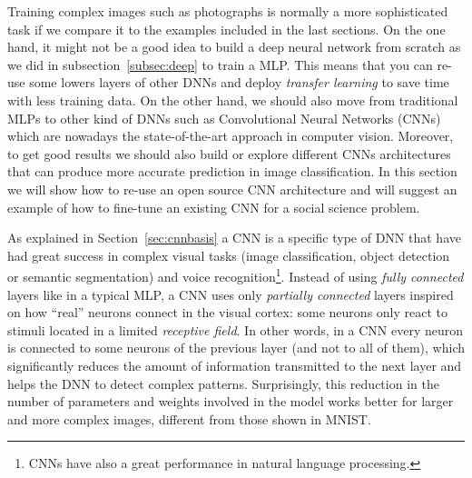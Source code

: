 Training complex images such as photographs is normally a more sophisticated task if we compare it to the examples included in the last sections. On the one hand, it might not be a good idea to build a deep neural network from scratch as we did in subsection~\ref{subsec:deep} to train a MLP. This means that you can re-use some lowers layers of other DNNs and deploy \textit{transfer learning} to save time with less training data. On the other hand, we should also move from traditional MLPs to other kind of DNNs such as Convolutional Neural Networks (CNNs) which are  nowadays the state-of-the-art approach in computer vision. Moreover, to get good results we should also build or explore different CNNs architectures that can produce more accurate prediction in image classification.  In this section we will show how to re-use an open source CNN architecture and will suggest an example of how to fine-tune an existing CNN for a social science problem.

As explained in Section~\ref{sec:cnnbasis} a CNN is a specific type of DNN that have had great success in complex visual tasks (image classification, object detection or semantic segmentation) and voice recognition\footnote{CNNs have also a great performance in natural language processing.}. Instead of using \textit{fully connected} layers like in a typical MLP, a CNN uses only \textit{partially connected} layers inspired on how ``real'' neurons connect in the visual cortex: some neurons only react to stimuli located in a limited \textit{receptive field}. In other words, in a CNN every neuron is connected to some neurons of the previous layer (and not to all of them), which significantly reduces the amount of information transmitted to the next layer and helps the DNN to detect complex patterns. Surprisingly, this reduction in the number of parameters and weights involved in the model works better for larger and more complex images, different from those shown in MNIST.

